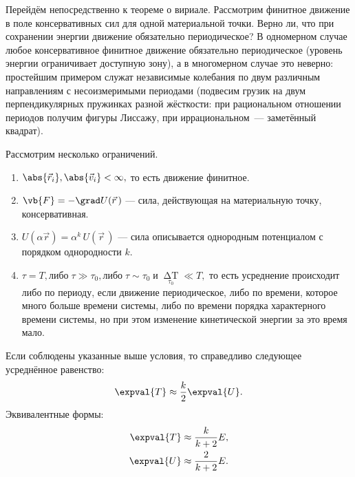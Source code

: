 Перейдём непосредственно к теореме о вириале. Рассмотрим финитное движение в поле консервативных сил для одной материальной точки. Верно ли, что при сохранении энергии движение обязательно периодическое? В одномерном случае любое консервативное финитное движение обязательно периодическое (уровень энергии ограничивает доступную зону), а в многомерном случае это неверно: простейшим примером служат независимые колебания по двум  различным направлениям с несоизмеримыми периодами (подвесим грузик на двум перпендикулярных пружинках разной жёсткости: при рациональном отношении периодов получим фигуры Лиссажу, при иррациональном~--- заметённый квадрат).

\begin{thm} Рассмотрим несколько ограничений.
\begin{enumerate}
\item $\abs{\vec{r}_i}, \abs{\vec{v}_i} < \infty,$ то есть движение финитное.
\item $\vb{F} = - \grad U(\vec{r}\,)$ --- сила, действующая на материальную точку, консервативная. \label{potential}
\item $U(\alpha \vec{r}) = \alpha^k\,U(\vec{r}\,) $ --- сила описывается однородным потенциалом с порядком однородности $k$. \label{homogeneity}
\item $\tau = T, \text{либо}\; \tau \gg \tau_0, \text{либо}\; \tau \sim \tau_0\; \text{и}\; \mathop{\Delta T}\limits_{\tau_0} \ll T,$ то есть усреднение происходит либо по периоду, если движение периодическое, либо по времени, которое много больше времени системы, либо по времени порядка характерного времени системы, но при этом изменение кинетической энергии за это время мало.
\end{enumerate}

\noindent Если соблюдены указанные выше условия, то справедливо следующее усреднённое равенство:
\begin{equation}
\expval{T} \approx \frac{k}{2} \expval{U}.
\end{equation}
Эквивалентные формы:
\begin{align}
\expval{T} &\approx \frac{k}{k+2} E,\\
\expval{U} &\approx \frac{2}{k+2} E. 
\end{align}
\end{thm}
